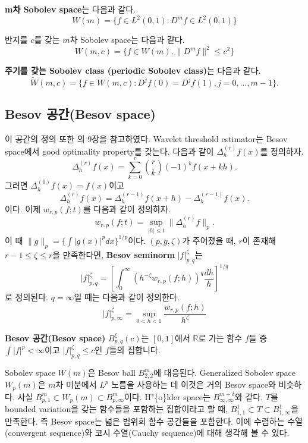 \documentclass[b5paper,]{scrbook}
\theoremstyle{plain}
\theoremstyle{definition}
\numberwithin{equation}{section}
\let\BeginKnitrBlock\begin \let\EndKnitrBlock\end
\begin{document}
\BeginKnitrBlock{definition}[Sobolev 공간]
\protect\hypertarget{def:unnamed-chunk-32}{}{\label{def:unnamed-chunk-32} {} }\textbf{m차 Sobolev space}는 다음과 같다.
\[W(m)=\{ f \in L^{2}(0,1): D^{m}f \in L^{2}(0,1)\}\]

반지를 \(c\)를 갖는 \(m\)차 Sobolev space는 다음과 같다.
\[W(m,c)=\{ f \in W(m), \| D^{m}f \|^{2} \leq c^{2}\}\]

\textbf{주기를 갖는 Sobolev class (periodic Sobolev class)}는 다음과 같다.
\[\tilde{W}(m,c)=\{ f \in W(m,c): D^{j}f(0)=D^{j}f(1), j=0,\ldots, m-1 \}.\]
\EndKnitrBlock{definition}

\hypertarget{besov-besov-space}{%
\subsection{Besov 공간(Besov space)}\label{besov-besov-space}}

이 공간의 정의 또한 \citep{Wasserman2006}의 9장을 참고하였다. Wavelet threshold estimator는 Besov space에서 good optimality property를 갖는다. 다음과 같이 \(\Delta_{h}^{(r)}f(x)\)를 정의하자.
\[\Delta_{h}^{(r)}f(x)=\sum_{k=0}^{r}\binom{r}{k}(-1)^{k}f(x+kh).\]
그러면 \(\Delta_{h}^{(0)}f(x)=f(x)\)이고
\[\Delta_{h}^{(r)}f(x)=\Delta_{h}^{(r-1)}f(x+h)-\Delta_{h}^{(r-1)}f(x).\]
이다. 이제 \(w_{r,p}(f;t)\)를 다음과 같이 정의하자.
\[w_{r,p}(f;t)=\sup_{|h|\leq t}\|\Delta_{h}^{(r)}f\|_{p}.\]
이 때 \(\|g\|_{p}=\{ \int |g(x)|^{p}dx \}^{1/p}\)이다. \((p,g,\zeta)\)가 주어졌을 때, \(r\)이 존재해 \(r-1\leq \zeta \leq r\)을 만족한다면, \textbf{Besov seminorm} \(|f|_{p,q}^{\zeta}\)는
\[|f|_{p,q}^{\zeta}=[\int_{0}^{\infty}(h^{-\zeta}w_{r,p}(f;h))^{q}\frac{dh}{h}]^{1/q}\]
로 정의된다. \(q=\infty\)일 때는 다음과 같이 정의한다.
\[|f|_{p,\infty}^{\zeta}=\sup_{0<h<1}\frac{w_{r,p}(f;h)}{h^{\zeta}}\]

\BeginKnitrBlock{definition}[Besov 공간]
\protect\hypertarget{def:unnamed-chunk-33}{}{\label{def:unnamed-chunk-33} {} }\textbf{Besov 공간(Besov space)} \(B_{p,q}^{\xi}(c)\)는 \([0,1]\)에서 \(\mathbb{R}\)로 가는 함수 \(f\)들 중 \(\int |f|^{p}<\infty\)이고 \(|f|_{p,q}^{\zeta}\leq c\)인 \(f\)들의 집합니다.
\EndKnitrBlock{definition}

Sobolev space \(W(m)\)은 Besov ball \(B_{2,2}^{m}\)에 대응된다. Generalized Sobolev space \(W_{p}(m)\)은 \(m\)차 미분에서 \(L^{p}\) 노름을 사용하는 데 이것은 거의 Besov space와 비슷하다. 사실 \(B_{p,1}^{m} \subset W_{p}(m) \subset B_{p,\infty}^{m}\)이다. H"\{o\}lder space는 \(B_{\infty,\infty}^{m+\delta}\)와 같다. \(T\)를 bounded variation을 갖는 함수들을 포함하는 집합이라고 할 때, \(B_{1,1}^{1}\subset T \subset B_{1,\infty}^{1}\)을 만족한다. 즉 Besov space는 넓은 범위희 함수 공간들을 포함한다. 이에 수렴하는 수열(convergent sequence)와 코시 수열(Cauchy sequence)에 대해 생각해 볼 수 있다.
\end{document}
